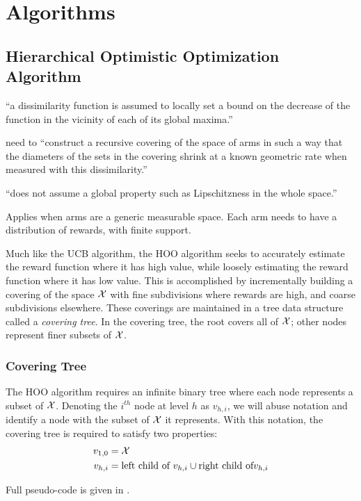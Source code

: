 \section{Algorithms}
\subsection{Hierarchical Optimistic Optimization Algorithm}

``a dissimilarity function is assumed to locally set a bound on the
decrease of the function in the vicinity of each of its global
maxima.''

need to ``construct a recursive covering of the space of arms in such
a way that the diameters of the sets in the covering shrink at a known
geometric rate when measured with this dissimilarity.''

``does not assume a global property such as Lipschitzness in the whole
space.''

Applies when arms are a generic measurable space. Each arm needs to
have a distribution of rewards, with finite support.

Much like the UCB algorithm, the HOO algorithm seeks to accurately
estimate the reward function where it has high value, while loosely
estimating the reward function where it has low value. This is
accomplished by incrementally building a covering of the space ${\mathcal{X}}$
with fine subdivisions where rewards are high, and coarse subdivisions
elsewhere. These coverings are maintained in a tree data structure
called a \emph{covering tree}. In the covering tree, the root covers
all of ${\mathcal{X}}$; other nodes represent finer subsets of ${\mathcal{X}}$.

\subsubsection{Covering Tree}
The HOO algorithm requires an infinite binary tree where each node
represents a subset of ${\mathcal{X}}$. Denoting the $i^{th}$ node at level $h$
as $v_{h,i}$, we will abuse notation and identify a node with the
subset of ${\mathcal{X}}$ it represents. With this notation, the covering tree
is required to satisfy two properties:
\begin{align*}
  v_{1,0} &= {\mathcal{X}}\\
  v_{h,i} &= \text{left child of } v_{h,i} \cup \text{right child of} v_{h,i}
\end{align*}

Full pseudo-code is given in .

